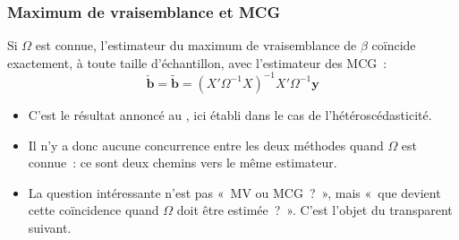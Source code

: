 \documentclass[10pt]{beamer}
\begin{document}
\begin{frame}
  \frametitle{Maximum de vraisemblance et MCG}

  \begin{prop}\label{prop:mv:mcg}
    Si $\Omega$ est connue, l'estimateur du maximum de vraisemblance de $\beta$
    coïncide exactement, à toute taille d'échantillon, avec l'estimateur des
    MCG~:
    \[
      \check{\mathbf b} = \tilde{\mathbf b}
      = \left(X'\Omega^{-1}X\right)^{-1}X'\Omega^{-1}\mathbf y
    \]
  \end{prop}

  \bigskip

  \begin{itemize}

  \item C'est le résultat annoncé au , ici établi dans le cas de
    l'hétéroscédasticité.\newline

  \item Il n'y a donc aucune concurrence entre les deux méthodes quand $\Omega$
    est connue~: ce sont deux chemins vers le même estimateur.\newline

  \item[\dbend] La question intéressante n'est pas «~MV ou MCG~?~», mais «~que
    devient cette coïncidence quand $\Omega$ doit être estimée~?~». C'est
    l'objet du transparent suivant.\newline

  \end{itemize}

\end{frame}
\end{document}
